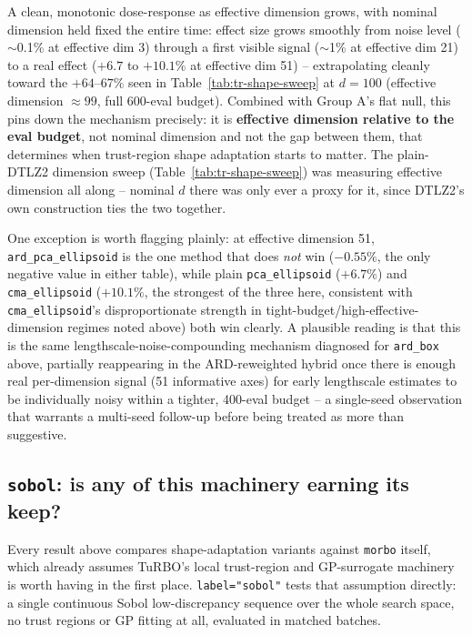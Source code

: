 \documentclass[11pt]{article}
\begin{document}
A clean, monotonic dose-response as effective dimension grows, with
nominal dimension held fixed the entire time: effect size grows smoothly
from noise level ($\sim$0.1\% at effective dim 3) through a first visible
signal ($\sim$1\% at effective dim 21) to a real effect ($+6.7$ to
$+10.1\%$ at effective dim 51) -- extrapolating cleanly toward the
$+64$--$67\%$ seen in Table~\ref{tab:tr-shape-sweep} at $d{=}100$
(effective dimension $\approx 99$, full 600-eval budget). Combined with
Group A's flat null, this pins down the mechanism precisely: it is
\textbf{effective dimension relative to the eval budget}, not nominal
dimension and not the gap between them, that determines when trust-region
shape adaptation starts to matter. The plain-DTLZ2 dimension sweep
(Table~\ref{tab:tr-shape-sweep}) was measuring effective dimension all
along -- nominal $d$ there was only ever a proxy for it, since DTLZ2's own
construction ties the two together.

One exception is worth flagging plainly: at effective dimension 51,
\texttt{ard\_pca\_ellipsoid} is the one method that does \emph{not} win
($-0.55\%$, the only negative value in either table), while plain
\texttt{pca\_ellipsoid} ($+6.7\%$) and \texttt{cma\_ellipsoid} ($+10.1\%$,
the strongest of the three here, consistent with \texttt{cma\_ellipsoid}'s
disproportionate strength in tight-budget/high-effective-dimension regimes
noted above) both win clearly. A plausible reading is that this is the
same lengthscale-noise-compounding mechanism diagnosed for
\texttt{ard\_box} above, partially reappearing in the ARD-reweighted
hybrid once there is enough real per-dimension signal (51 informative
axes) for early lengthscale estimates to be individually noisy within a
tighter, 400-eval budget -- a single-seed observation that warrants a
multi-seed follow-up before being treated as more than suggestive.

\subsection{\texttt{sobol}: is any of this machinery earning its keep?}

Every result above compares shape-adaptation variants against
\texttt{morbo} itself, which already assumes TuRBO's local trust-region
and GP-surrogate machinery is worth having in the first place.
\texttt{label="sobol"} tests that assumption directly: a single continuous
Sobol low-discrepancy sequence over the whole search space, no trust
regions or GP fitting at all, evaluated in matched batches.
\end{document}
